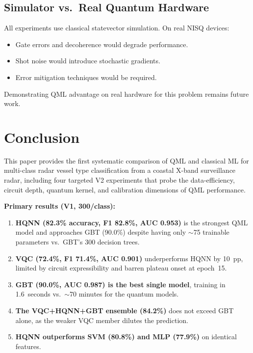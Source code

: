 \documentclass[journal]{IEEEtran}
\begin{document}
\subsection{Simulator vs.\ Real Quantum Hardware}

All experiments use classical statevector simulation. On real NISQ devices:
\begin{itemize}
  \item Gate errors and decoherence would degrade performance.
  \item Shot noise would introduce stochastic gradients.
  \item Error mitigation techniques would be required.
\end{itemize}
Demonstrating QML advantage on real hardware for this problem remains future work.

\section{Conclusion}

This paper provides the first systematic comparison of QML and classical ML for
multi-class radar vessel type classification from a coastal X-band surveillance
radar, including four targeted V2 experiments that probe the data-efficiency,
circuit depth, quantum kernel, and calibration dimensions of QML performance.

\noindent\textbf{Primary results (V1, 300/class):}
\begin{enumerate}
  \item \textbf{HQNN (82.3\% accuracy, F1 82.8\%, AUC 0.953)} is the strongest
        QML model and approaches GBT (90.0\%) despite having only $\sim$75
        trainable parameters vs.\ GBT's 300 decision trees.
  \item \textbf{VQC (72.4\%, F1 71.4\%, AUC 0.901)} underperforms HQNN by
        10~pp, limited by circuit expressibility and barren plateau onset at
        epoch~15.
  \item \textbf{GBT (90.0\%, AUC 0.987) is the best single model}, training
        in 1.6~seconds vs.\ $\sim$70 minutes for the quantum models.
  \item \textbf{The VQC+HQNN+GBT ensemble (84.2\%)} does not exceed GBT alone,
        as the weaker VQC member dilutes the prediction.
  \item \textbf{HQNN outperforms SVM (80.8\%) and MLP (77.9\%)} on identical
        features.
\end{enumerate}
\end{document}

